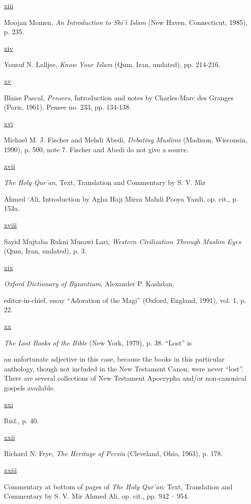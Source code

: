 \hyperref[_ednref13]{ xiii }

Moojan Momen, \emph{An Introduction to Shi'i Islam} (New Haven, Connecticut, 1985), p. 235.

\hyperref[_ednref14]{ xiv }

Yousuf N. Lalljee, \emph{Know Your Islam} (Qum, Iran, undated), pp. 214-216.

\hyperref[_ednref15]{ xv }

Blaise Pascal, \emph{Pensees}, Introduction and notes by Charles-Marc des Granges (Paris, 1961), Pensee no. 233, pp. 134-138.

\hyperref[_ednref16]{ xvi }

Michael M. J. Fischer and Mehdi Abedi, \emph{Debating Muslims} (Madison, Wisconsin, 1990), p. 500, note 7. Fischer and Abedi do not give a source.

\hyperref[_ednref17]{ xvii }

\emph{The Holy Qur'an}, Text, Translation and Commentary by S. V. Mir

Ahmed `Ali, Introduction by Agha Haji Mirza Mahdi Pooya Yazdi, op. cit., p. 153a.

\hyperref[_ednref18]{ xviii }

Sayid Mujtaba Rukni Musawi Lari, \emph{Western Civilization Through Muslim Eyes} (Qum, Iran, undated), p. 3.

\hyperref[_ednref19]{ xix }

\emph{Oxford Dictionary of Byzantium}, Alexander P. Kashdan,

editor-in-chief, essay ``Adoration of the Magi'' (Oxford, England, 1991), vol. 1, p. 22.

\hyperref[_ednref20]{ xx }

\emph{The Lost Books of the Bible} (New York, 1979), p. 38. ``Lost'' is

an unfortunate adjective in this case, because the books in this particular anthology, though not included in the New Testament Canon, were never ``lost''. There are several collections of New Testament Apocrypha and/or non-canonical gospels available.

\hyperref[_ednref21]{ xxi }

Ibid., p. 40.

\hyperref[_ednref22]{ xxii }

Richard N. Frye, \emph{The Heritage of Persia} (Cleveland, Ohio, 1963), p. 178.

\hyperref[_ednref23]{ xxiii }

Commentary at bottom of pages of \emph{The Holy Qur'an}: Text, Translation and Commentary by S. V. Mir Ahmed Ali, op. cit., pp. 942 -- 954.

